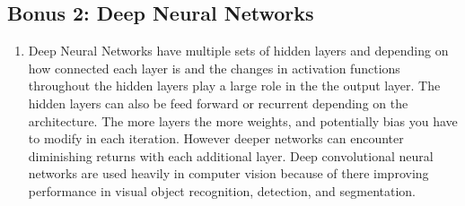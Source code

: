 \documentclass[main.tex]{subfiles}
\begin{document}
\subsection{Bonus 2: Deep Neural Networks}
    \begin{enumerate}
        \item Deep Neural Networks have multiple sets of hidden layers and depending on how connected each layer is and the changes in activation functions throughout the hidden layers play a large role in the the output layer. The hidden layers can also be feed forward or recurrent depending on the architecture. The more layers the more weights, and potentially bias you have to modify in each iteration. However deeper networks can encounter diminishing returns with each additional layer. Deep convolutional neural networks are used heavily in computer vision because of there improving performance in visual object recognition, detection, and segmentation.
    \end{enumerate}
\end{document}
